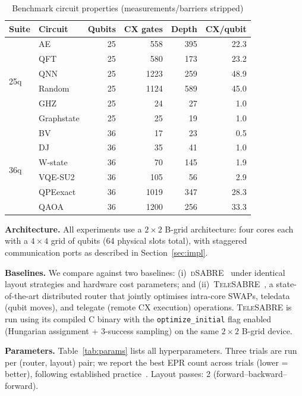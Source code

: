 \documentclass[conference]{IEEEtran}
\newcommand{\dSABRE}{\textsc{dSABRE}}
\newcommand{\TeleSABRE}{\textsc{TeleSABRE}}
\begin{document}
\begin{table}[t]
\centering
\caption{Benchmark circuit properties (measurements/barriers stripped)}
\label{tab:circuits}
\setlength{\tabcolsep}{5pt}
\begin{tabular}{@{}llrrrr@{}}
\toprule
Suite & Circuit    & Qubits & CX gates & Depth & CX/qubit \\
\midrule
\multirow{6}{*}{25q}
 & AE         & 25 &  558 & 395 & 22.3 \\
 & QFT        & 25 &  580 & 173 & 23.2 \\
 & QNN        & 25 & 1223 & 259 & 48.9 \\
 & Random     & 25 & 1124 & 589 & 45.0 \\
 & GHZ        & 25 &   24 &  27 &  1.0 \\
 & Graphstate & 25 &   25 &  19 &  1.0 \\
\midrule
\multirow{6}{*}{36q}
 & BV         & 36 &   17 &  23 &  0.5 \\
 & DJ         & 36 &   35 &  41 &  1.0 \\
 & W-state    & 36 &   70 & 145 &  1.9 \\
 & VQE-SU2   & 36 &  105 &  56 &  2.9 \\
 & QPEexact   & 36 & 1019 & 347 & 28.3 \\
 & QAOA       & 36 & 1200 & 256 & 33.3 \\
\bottomrule
\end{tabular}
\end{table}

\textbf{Architecture.}
All experiments use a $2\!\times\!2$ B-grid architecture: four cores each with
a $4\!\times\!4$ grid of qubits (64 physical slots total), with staggered
communication ports as described in Section~\ref{sec:impl}.

\textbf{Baselines.}
We compare against two baselines: (i)~\dSABRE{}~\cite{andres2019automated}
under identical layout strategies and hardware cost parameters; and
(ii)~\TeleSABRE{}~\cite{russo2025telesabre}, a state-of-the-art distributed
router that jointly optimises intra-core SWAPs, teledata (qubit moves), and
telegate (remote CX execution) operations.
\TeleSABRE{} is run using its compiled C binary with the \texttt{optimize\_initial}
flag enabled (Hungarian assignment + 3-success sampling) on the same
$2\!\times\!2$ B-grid device.

\textbf{Parameters.}
Table~\ref{tab:params} lists all hyperparameters.
Three trials are run per (router, layout) pair; we report the best EPR count
across trials (lower = better), following established practice~\cite{li2019tackling}.
Layout passes: 2 (forward–backward–forward).
\end{document}
